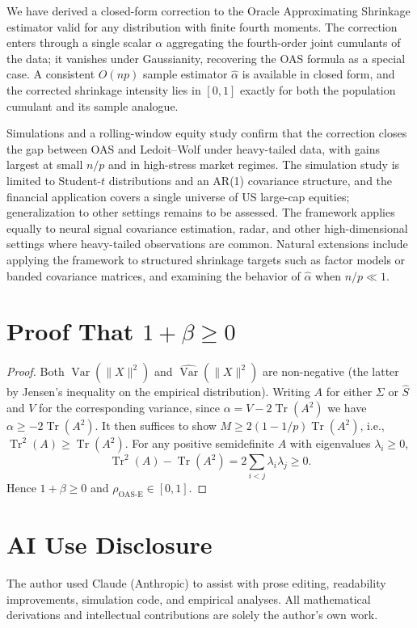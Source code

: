 \documentclass[journal]{IEEEtran}
\begin{document}
We have derived a closed-form correction to the Oracle Approximating Shrinkage estimator
valid for any distribution with finite fourth moments.
The correction enters through a single scalar $\alpha$ aggregating the fourth-order joint
cumulants of the data; it vanishes under Gaussianity, recovering the OAS formula
as a special case.
A consistent $O(np)$ sample estimator $\hat{\alpha}$ is available in closed form, and the
corrected shrinkage intensity lies in $[0,1]$ exactly for both the population cumulant and
its sample analogue.

Simulations and a rolling-window equity study confirm that the correction closes the gap
between OAS and Ledoit--Wolf under heavy-tailed data, with gains largest at small
$n/p$ and in high-stress market regimes.
The simulation study is limited to Student-$t$ distributions and an AR(1) covariance
structure, and the financial application covers a single universe of US large-cap equities;
generalization to other settings remains to be assessed.
The framework applies equally to neural signal covariance estimation, radar, and other
high-dimensional settings where heavy-tailed observations are common.
Natural extensions include applying the framework to structured shrinkage targets such as
factor models or banded covariance matrices, and examining the behavior of $\hat{\alpha}$
when $n/p\ll1$.

\appendix
\section{Proof That $1+\beta\geq 0$}
\label{app:proof}

\begin{proof}
Both $\operatorname{Var}(\lVert X\rVert^2)$ and $\widehat{\operatorname{Var}}(\lVert X\rVert^2)$
are non-negative (the latter by Jensen's inequality on the empirical distribution).
Writing $A$ for either $\Sigma$ or $\hat{S}$ and $V$ for the corresponding variance,
since $\alpha=V-2\operatorname{Tr}(A^2)$ we have $\alpha\geq-2\operatorname{Tr}(A^2)$.
It then suffices to show $M\geq2(1-1/p)\operatorname{Tr}(A^2)$, i.e.,
$\operatorname{Tr}^2(A)\geq\operatorname{Tr}(A^2)$.
For any positive semidefinite $A$ with eigenvalues $\lambda_i\geq0$,
\[
\operatorname{Tr}^2(A)-\operatorname{Tr}(A^2) = 2\sum_{i<j}\lambda_i\lambda_j \geq 0.
\]
Hence $1+\beta\geq0$ and $\rho_{\text{OAS-E}}\in[0,1]$.
\end{proof}

\section*{AI Use Disclosure}
The author used Claude (Anthropic) to assist with prose editing,
readability improvements, simulation code, and empirical analyses.
All mathematical derivations and intellectual contributions are
solely the author's own work.
\end{document}
